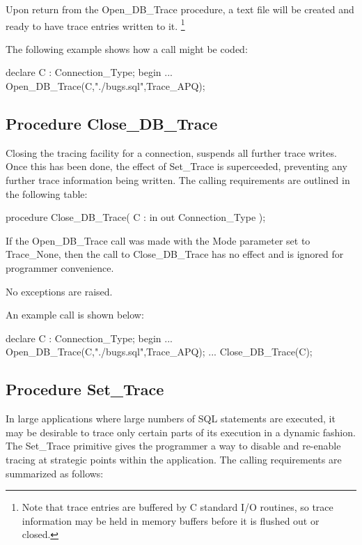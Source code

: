 \documentclass[english,letterpaper]{book}
\begin{document}
Upon return from the Open\_DB\_Trace procedure, a text file will be
created and ready to have trace entries written to it.%
\footnote{Note that trace entries are buffered by C standard I/O routines, so
trace information may be held in memory buffers before it is flushed
out or closed.%
}

The following example shows how a call might be coded:

\begin{Example}
declare
   C : Connection_Type;
begin
   ...
   Open_DB_Trace(C,"./bugs.sql",Trace_APQ);
\end{Example}

\subsection{Procedure Close\_DB\_Trace}

Closing the tracing facility for a connection, suspends all further
trace writes. Once this has been done, the effect of Set\_Trace is
superceeded, preventing any further trace information being written.
The calling requirements are outlined in the following table:

\begin{Code}
procedure Close_DB_Trace(
   C : in out Connection_Type
);
\end{Code}

If the Open\_DB\_Trace call was made with the Mode parameter set to
Trace\_None, then the call to Close\_DB\_Trace has no effect and is
ignored for programmer convenience.

No exceptions are raised.

An example call is shown below:

\begin{Example}
declare
   C : Connection_Type;
begin
   ...
   Open_DB_Trace(C,"./bugs.sql",Trace_APQ);
   ...
   Close_DB_Trace(C);
\end{Example}

\subsection{Procedure Set\_Trace}

In large applications where large numbers of SQL statements are executed,
it may be desirable to trace only certain parts of its execution in
a dynamic fashion. The Set\_Trace primitive gives the programmer a
way to disable and re-enable tracing at strategic points within the
application. The calling requirements are summarized as follows:
\end{document}
